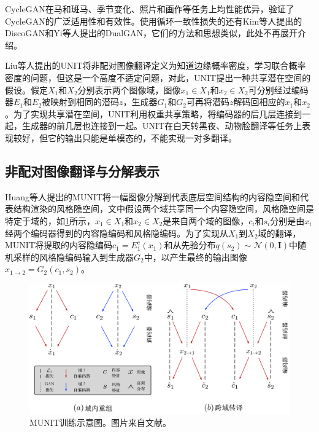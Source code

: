 CycleGAN在马和斑马、季节变化、照片和画作等任务上均性能优异，验证了CycleGAN的广泛适用性和有效性。使用循环一致性损失的还有Kim等人\cite{kim2017learning}提出的DiscoGAN和Yi等人\cite{yi2017dualgan}提出的DualGAN，它们的方法和思想类似，此处不再展开介绍。

Liu等人提出的UNIT\cite{liu2017unsupervised}将非配对图像翻译定义为知道边缘概率密度，学习联合概率密度的问题，但这是一个高度不适定问题，对此，UNIT提出一种共享潜在空间的假设。假定$X_1$和$X_2$分别表示两个图像域，图像$x_1\in X_1$和$x_2\in X_2$可分别经过编码器$E_1$和$E_2$被映射到相同的潜码$z$，生成器$G_1$和$G_2$可再将潜码$z$解码回相应的$x_1$和$x_2$。为了实现共享潜在空间，UNIT利用权重共享策略，将编码器的后几层连接到一起，生成器的前几层也连接到一起。UNIT在白天转黑夜、动物脸翻译等任务上表现较好，但它的输出只能是单模态的，不能实现一对多翻译。

\subsection{非配对图像翻译与分解表示}

Huang等人提出的MUNIT\cite{huang2018multimodal}将一幅图像分解到代表底层空间结构的内容隐空间和代表结构渲染的风格隐空间，文中假设两个域共享同一个内容隐空间，风格隐空间是特定于域的，如\ref{MUNIT}所示，$x_1 \in X_1$和$x_2 \in X_2$是来自两个域的图像，$c_i$和$s_i$分别是由$x_i$经两个编码器得到的内容隐编码和风格隐编码。为了实现从$X_1$到$X_2$域的翻译，MUNIT将提取的内容隐编码$c_1=E_1^c(x_1)$和从先验分布$q(s_2)\sim\mathcal{N}(0, \mathbf{I})$中随机采样的风格隐编码输入到生成器$G_2$中，以产生最终的输出图像$x_{1\to2}=G_2(c_1,s_2)$。

\begin{figure}[ht]
    \centering
	\includegraphics[width=\textwidth]{figs/MUNIT.pdf}
	\caption{MUNIT训练示意图。图片来自文献\cite{huang2018multimodal}。}
	\label{MUNIT}
\end{figure}

